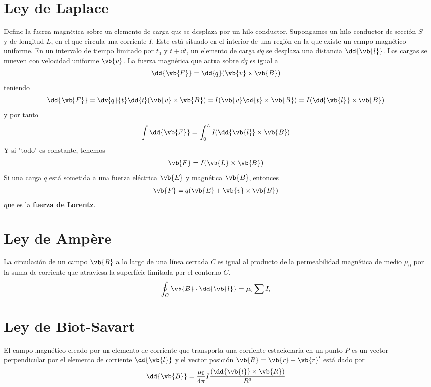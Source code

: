 \documentclass{./FisicaII.tex}
\begin{document}
\section{Ley de Laplace}
Define la fuerza magnética sobre un elemento de carga que se desplaza por un hilo
conductor. Supongamos un hilo conductor de sección \(S\) y de longitud \(L\),
en el que circula una corriente \(I\). Este está situado en el interior de una región
en la que existe un campo magnético uniforme. En un intervalo de tiempo limitado por
\(t_{0}\) y \(t+ \dd{t}\), un elemento de carga \( \dd{q}\) se desplaza una distancia
\( \dd{\vb{l}}\). Las cargas se mueven con velocidad uniforme \(\vb{v}\). La fuerza
magnética que actua sobre \( \dd{q}\) es igual a
\begin{equation}
    \begin{split}
        \dd{\vb{F}} = \dd{q}(\vb{v} \times \vb{B})
    \end{split}
\end{equation}
teniendo
\[
    \dd{\vb{F}} = \dv{q}{t} \dd{t} (\vb{v} \times \vb{B}) =
    I ( \vb{v} \dd{t} \times \vb{B}) = I ( \dd{\vb{l}} \times \vb{B})
\]
y por tanto
\[
    \int \dd{\vb{F}} = \int_{0}^L I ( \dd{\vb{l}} \times \vb{B})
\]
Y si "todo" es constante, tenemos
\begin{equation}
    \begin{split}
        \vb{F} = I(\vb{L} \times \vb{B})
    \end{split}
\end{equation}
Si una carga \(q\) está sometida a una fuerza eléctrica \(\vb{E}\) y magnética \(\vb{B}\),
entonces
\begin{equation}
    \begin{split}
        \vb{F} = q(\vb{E} + \vb{v} \times \vb{B})
    \end{split}
\end{equation}
que es la \textbf{fuerza de Lorentz}.
\section{Ley de Ampère}
La circulación de un campo \(\vb{B}\) a lo largo de una línea cerrada \(C\) es igual al
producto de la permeabilidad magnética de medio \(\mu_{0}\) por la suma de corriente que
atraviesa la superfície limitada por el contorno \(C\).
\begin{equation}
    \begin{split}
        \oint_{C} \vb{B} \cdot \dd{\vb{l}} = \mu_{0} \sum  I_{i}
    \end{split}
\end{equation}
\section{Ley de Biot-Savart}
El campo magnético creado por un elemento de corriente que transporta
una corriente estacionaria en un punto $P$ es un vector perpendicular
por el elemento de corriente $\dd{\vb{l}}$ y el vector posición
$\vb{R} = \vb{r} - \vb{r}'$ está dado por
\begin{equation}
	\begin{split}
		\dd{\vb{B}} = \frac{\mu_{0}}{4 \pi} I\frac{(\dd{\vb{l}}\times \vb{R})}{R^{3}}
	\end{split}
\end{equation}
\end{document}

